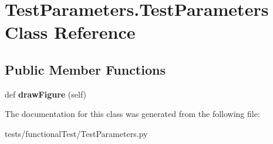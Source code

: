 \hypertarget{class_test_parameters_1_1_test_parameters}{}\section{Test\+Parameters.\+Test\+Parameters Class Reference}
\label{class_test_parameters_1_1_test_parameters}
\subsection*{Public Member Functions}
\begin{DoxyCompactItemize}
\item 
\mbox{\label{class_test_parameters_1_1_test_parameters_a390dd3de3015f5d9b125ea92bd726d2a}} 
def {\bfseries draw\+Figure} (self)
\end{DoxyCompactItemize}


The documentation for this class was generated from the following file\+:\begin{DoxyCompactItemize}
\item 
tests/functional\+Test/Test\+Parameters.\+py\end{DoxyCompactItemize}
